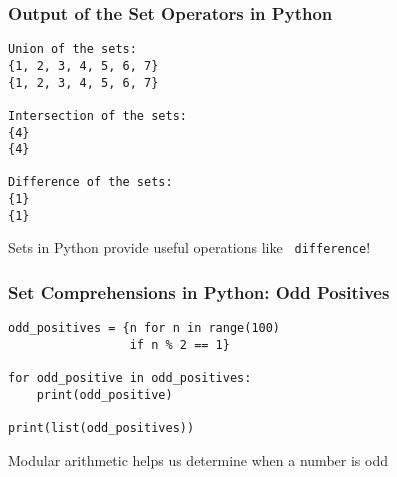 \documentclass[14pt,aspectratio=169]{beamer}
\begin{document}
%
\begin{frame}[fragile]
  \frametitle{Output of the Set Operators in Python}
  \normalsize
  \begin{minipage}{6in}
    \vspace*{.25in}
    \begin{verbatim}
Union of the sets:
{1, 2, 3, 4, 5, 6, 7}
{1, 2, 3, 4, 5, 6, 7}

Intersection of the sets:
{4}
{4}

Difference of the sets:
{1}
{1}
    \end{verbatim}
  \end{minipage}
  \vspace*{.05in}
  \begin{center}
    \normalsize \noindent Sets in Python provide useful operations like {\tt
    difference}! \\
  \end{center}
\end{frame}

%
\begin{frame}[fragile]
  \frametitle{Set Comprehensions in Python: Odd Positives}
  \normalsize
  \begin{minipage}{6in}
    \vspace*{.25in}
    \begin{verbatim}
odd_positives = {n for n in range(100)
                 if n % 2 == 1}

for odd_positive in odd_positives:
    print(odd_positive)

print(list(odd_positives))
    \end{verbatim}
  \end{minipage}
  \vspace*{.05in}
  \begin{center}
    \normalsize \noindent Modular arithmetic helps us determine when a number is
    odd\\
  \end{center}
\end{frame}
\end{document}
